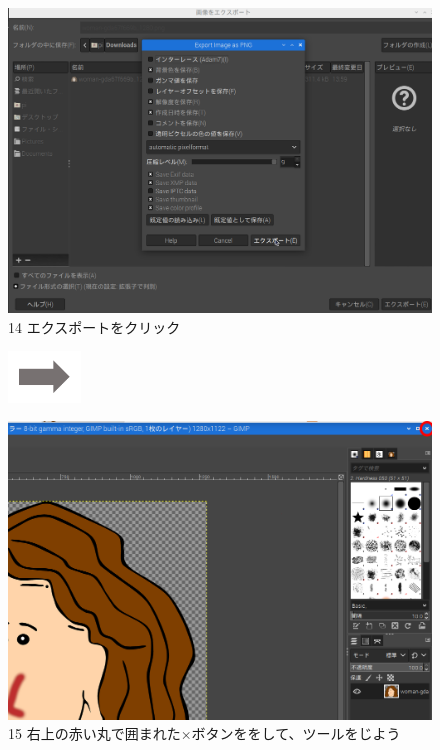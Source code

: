 \begin{figure}
  \bigskip


  \begin{minipage}{\textwidth}
    \begin{minipage}{0.45\textwidth}
      \includegraphics[width=\linewidth]{text01-img/textbook-img134.png}\\
      14 エクスポートをクリック
    \end{minipage}
    \includegraphics[width=1.919cm]{text01-img/textbook-img135.png}
    \begin{minipage}{0.45\textwidth}
      \includegraphics[width=\linewidth]{text01-img/textbook-img1030.png}\\
      15 右上の赤い丸で囲まれた×ボタンををして、ツールをじよう
    \end{minipage}
  \end{minipage}
\end{figure}
\clearpage


